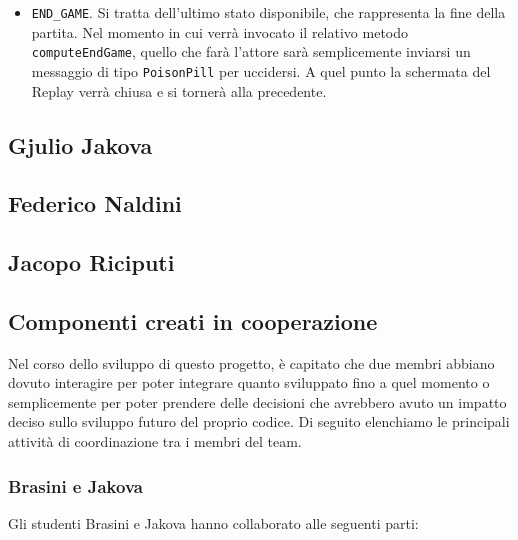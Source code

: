 \begin{itemize}
\begin {itemize}
     \item \texttt{END\_GAME}. Si tratta dell'ultimo stato disponibile, che rappresenta la fine della partita. Nel momento in cui verrà invocato il relativo metodo \texttt{computeEndGame}, quello che farà l'attore sarà semplicemente inviarsi un messaggio di tipo \texttt{PoisonPill} per uccidersi. A quel punto la schermata del Replay verrà chiusa e si tornerà alla precedente.
     
     
          \end{itemize}
     
    
     \end{itemize}
     
     
     
     
     \clearpage
        \subsection{Gjulio Jakova}\label{subsec:jakova}
        \subsection{Federico Naldini}\label{subsec:naldini}
        \subsection{Jacopo Riciputi}\label{subsec:riciputi}
        
        \clearpage
        
        \subsection{Componenti creati in cooperazione}\label{subsec:cooperation}
        Nel corso dello sviluppo di questo progetto, è capitato che due membri abbiano dovuto interagire per poter integrare quanto sviluppato fino a quel momento o semplicemente per poter prendere delle decisioni che avrebbero avuto un impatto deciso sullo sviluppo futuro del proprio codice. Di seguito elenchiamo le principali attività di coordinazione tra i membri del team.
        
        
        \subsubsection{Brasini e Jakova}\label{subsub:cooperation:brasinijakova}
        Gli studenti Brasini e Jakova hanno collaborato alle seguenti parti:
        
